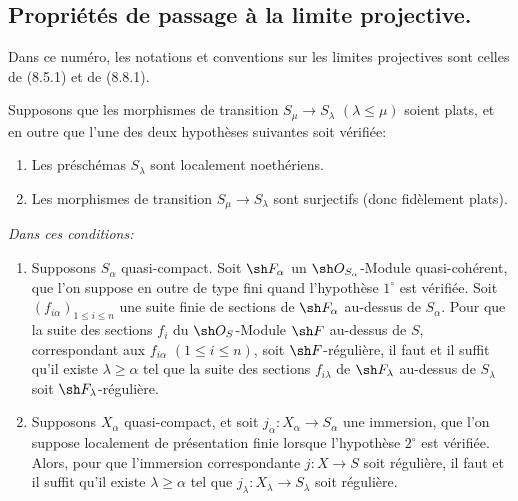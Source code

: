 \subsection{Propriétés de passage à la limite projective.}
\label{subsection:IV.19.8}
\label{IV.19.8}

Dans ce numéro, les notations et conventions sur les limites projectives sont celles de (8.5.1) et de (8.8.1).

\begin{proposition}[19.8.1]
\label{IV.19.8.1}
Supposons que les morphismes de transition $S_\mu\to S_\lambda$ $(\lambda\leq\mu)$ soient plats, et en outre que l'une des deux hypothèses suivantes soit vérifiée:
\begin{enumerate}
  \item[$1^\circ$] Les préschémas $S_\lambda$ sont localement noethériens.
  \item[$2^\circ$] Les morphismes de transition $S_\mu\to S_\lambda$ sont surjectifs (donc fidèlement plats).
\end{enumerate}


\emph{Dans ces conditions:}
\begin{enumerate}
  \item[(i)] Supposons $S_\alpha$ quasi-compact. Soit $\sh F_\alpha$ un $\sh O_{S_\alpha}$-Module quasi-cohérent, que l'on suppose en outre de type fini quand l'hypothèse $1^\circ$ est vérifiée. Soit $(f_{i\alpha})_{1\leq i\leq n}$ une suite finie de sections de $\sh F_\alpha$ au-dessus de $S_\alpha$. Pour que la suite des sections $f_i$ du $\sh O_S$-Module $\sh F$ au-dessus de $S$, correspondant aux $f_{i\alpha}$ $(1\leq i\leq n)$, soit $\sh F$-régulière, il faut et il suffit qu'il existe $\lambda\geq\alpha$ tel que la suite des sections $f_{i\lambda}$ de $\sh F_\lambda$ au-dessus de $S_\lambda$ soit $\sh F_\lambda$-régulière.
  \item[(ii)] Supposons $X_\alpha$ quasi-compact, et soit $j_\alpha:X_\alpha\to S_\alpha$ une immersion, que l'on suppose localement de présentation finie lorsque l'hypothèse $2^\circ$ est vérifiée. Alors, pour que l'immersion correspondante $j:X\to S$ soit régulière, il faut et il suffit qu'il existe $\lambda\geq\alpha$ tel que $j_\lambda:X_\lambda\to S_\lambda$ soit régulière.
\end{enumerate}
\end{proposition}


